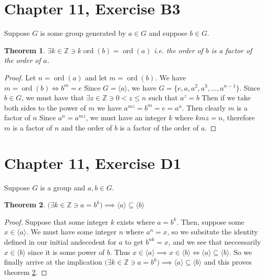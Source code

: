 \documentclass[12pt]{article}
\newcommand{\ints}{\mathbb{Z}}
\newcommand{\ord}{\operatorname{ord}}
\newtheorem{thm}{Theorem}
\begin{document}
\section{Chapter 11, Exercise B3}

Suppose $G$ is some group generated by $a \in G$
and suppose $b \in G$.

\begin{thm} \label{thm2}
	$\exists k \in \ints \ni k\ord(b) = \ord(a)$
	i.e. the order of $b$ is a factor of the order of $a$.
\end{thm}

\begin{proof}
	Let $n = \ord(a)$ and let $m = \ord(b)$.
	We have $m = \ord(b) \iff b^m = e$
	Since $G = \langle a \rangle$,
	we have $G = \{e, a, a^2, a^3, ..., a^{n-1} \}$.
	Since $b \in G$, we must have that
	$\exists z \in \ints \ni 0 < z \le n$
	such that $a^z = b$
	Then if we take both sides to the power of $m$
	we have $a^{mz} = b^m = e = a^n$.
	Then clearly $m$ is a factor of $n$
	Since $a^n = a^{mz}$,
	we must have an integer $k$ where
	$kmz = n$,
	therefore $m$ is a factor of $n$
	and the order of $b$ is a factor of the order of $a$.
\end{proof}

\section{Chapter 11, Exercise D1}

Suppose $G$ is a group and $a,b \in G$.

\begin{thm} \label{thm3}
	$\Big(\exists k \in \ints \ni a = b^k \Big) \implies
	\langle a \rangle \subseteq \langle b \rangle$
\end{thm}

\begin{proof}
	Suppose that some integer $k$ exists
	where $a = b^k$.
	Then, suppose some $x \in \langle a \rangle$.
	We must have some integer $n$ where $a^n = x$,
	so we subsitute the identity defined in our
	initial andecedent for $a$ to get $b^{nk} = x$,
	and we see that neccessarily $x \in \langle b \rangle$
	since it is some power of $b$.
	Thus $x \in \langle a \rangle \implies x \in \langle b \rangle
	\iff \langle a \rangle \subseteq \langle b \rangle$.
	So we finally arrive at the implication
	$\Big(\exists k \in \ints \ni a = b^k \Big) \implies
	\langle a \rangle \subseteq \langle b \rangle$
	and this proves theorem \ref{thm3}.
\end{proof}
\end{document}
